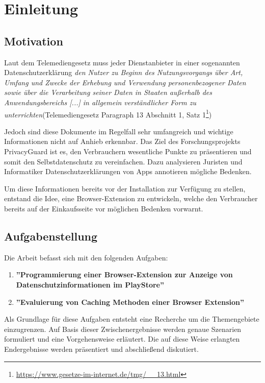 \chapter{Einleitung}
\label{c:einleitung}

\section{Motivation}
\label{s:motivation}
Laut dem Telemediengesetz muss jeder Dienstanbieter in einer sogenannten Datenschutzerklärung \textit{\glqq den Nutzer zu Beginn des Nutzungsvorgangs über Art, Umfang und Zwecke der Erhebung und Verwendung personenbezogener Daten sowie über die Verarbeitung seiner Daten in Staaten außerhalb des Anwendungsbereichs [...] in allgemein verständlicher Form zu unterrichten\grqq{}}(Telemediengesetz Paragraph 13 Abschnitt 1, Satz 1\footnote{\url{https://www.gesetze-im-internet.de/tmg/__13.html}})

Jedoch sind diese Dokumente im Regelfall sehr umfangreich und wichtige Informationen nicht auf Anhieb erkennbar. Das Ziel des Forschungsprojekts \glqq PrivacyGuard \grqq{} ist es, den Verbrauchern wesentliche Punkte zu präsentieren und somit den Selbstdatenschutz zu vereinfachen. Dazu analysieren Juristen und Informatiker Datenschutzerklärungen von Apps annotieren mögliche Bedenken. 

Um diese Informationen bereits vor der Installation zur Verfügung zu stellen, entstand die Idee, eine Browser-Extension zu entwickeln, welche den Verbraucher bereits auf der Einkaufsseite vor möglichen Bedenken vorwarnt.

\section{Aufgabenstellung}
\label{s:aufgabenstellung}

Die Arbeit befasst sich mit den folgenden Aufgaben:
\begin{enumerate}
	\item \textbf{''Programmierung einer Browser-Extension zur Anzeige von Datenschutzinformationen im PlayStore''}
	\item \textbf{''Evaluierung von Caching Methoden einer Browser Extension''}
\end{enumerate}

Als Grundlage für diese Aufgaben entsteht eine Recherche um die Themengebiete einzugrenzen. Auf Basis dieser Zwischenergebnisse werden genaue Szenarien formuliert und eine Vorgehensweise erläutert. Die auf diese Weise erlangten Endergebnisse werden präsentiert und abschließend diskutiert.

